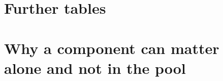 \section{Further tables}
\label{app:extra}

\begin{table}[h]
\caption{Test negative log-likelihood, respondent-disjoint protocol, weight fitted out of fold,
mean over seeds. Each row adds one channel to the same attribute model; controls are defined
in .}
\label{tab:main}
\centering\small

\end{table}


\begin{table}[h]
\caption{Replacing the text channel by the uniform distribution at the same fitted $\pi$. On
 and  the gain survives the shuffled, identity and random
controls but not this one.}
\label{tab:floor}
\centering\small

\end{table}

\begin{table}[h]
\caption{, the only dataset whose ordering field is calendar time.}
\label{tab:protocol}
\centering\small

\end{table}

\begin{table}[h]
\caption{Readers given identical information, respondent-disjoint protocol, three seeds.}
\label{tab:structural}
\centering\small

\end{table}

\begin{table}[h]
\caption{Removing one component at a time, respondent-disjoint protocol, out-of-fold weight,
three seeds. Positive means the removal hurts. Order within each block is Swissmetro, Optima,
LPMC.}
\label{tab:knockouts}
\centering\small

\end{table}

\section{Why a component can matter alone and not in the pool}
\label{app:weights}
\label{sec:why-weights}

